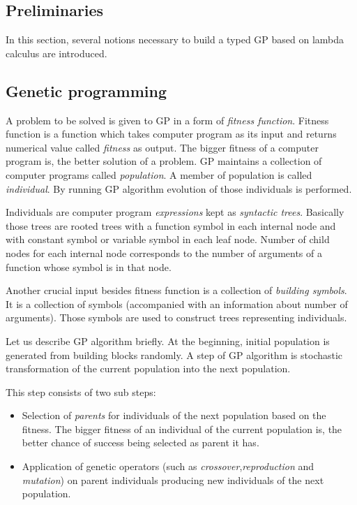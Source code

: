 \documentclass[11pt]{article}
\newcommand{\Lets}{Let us\xspace}
\begin{document}
\begin{article}
\section{Preliminaries}

In this section, several notions necessary to build a typed GP based on lambda calculus are introduced.

\subsection{Genetic programming}

A problem to be solved is given to GP in a form of \textit{fitness function}. Fitness function is a function which takes computer program as its input and  returns numerical value called \textit{fitness} as output. The bigger fitness of a computer program is, the better solution of a problem.
GP maintains a collection of computer programs called \textit{population}.  A member of population is called \textit{individual}. By running GP algorithm evolution of those individuals is performed.

Individuals are computer program \textit{expressions} kept as \textit{syntactic trees}. Basically those trees are rooted trees with a function symbol in each internal node and with constant symbol or variable symbol in each leaf node. 
Number of child nodes for each internal node corresponds to the number of arguments of a function whose symbol is in that node.

Another crucial input besides fitness function is a collection of \textit{building symbols}. It is a collection of symbols (accompanied with an information about number of arguments). Those symbols are used to construct trees representing individuals.

\Lets describe GP algorithm briefly. At the beginning, initial population is generated from building blocks randomly. A step of GP algorithm is stochastic transformation of the current population into the next population.

This step consists of two sub steps:

\begin{itemize} 
\item Selection of \textit{parents} for individuals of the next population based on the fitness. The bigger fitness of an individual of the current population is, the better chance of success being selected as parent it has.  
\item Application of genetic operators (such as \textit{crossover},\textit{reproduction} and \textit{mutation}) on parent individuals producing new individuals of the next population.  
\end{itemize}
	  

\end{article}
\end{document}

